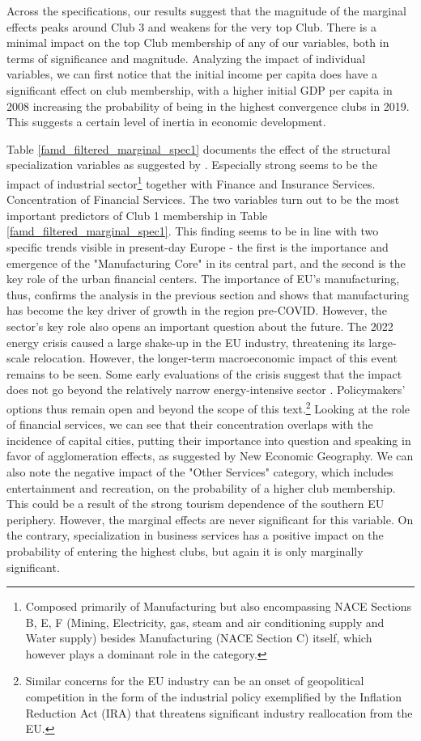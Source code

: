 \documentclass[11pt]{article}
\begin{document}
Across the specifications, our results suggest that the magnitude of the marginal effects peaks around Club 3 and weakens for the very top Club. There is a minimal impact on the top Club membership of any of our variables, both in terms of significance and magnitude. 
Analyzing the impact of individual variables, we can first notice that the initial income per capita does have a significant effect on club membership, with a higher initial GDP per capita in 2008 increasing the probability of being in the highest convergence clubs in 2019. This suggests a certain level of inertia in economic development.
 
Table \ref{famd_filtered_marginal_spec1} documents the effect of the structural specialization variables as suggested by \citet{cutrini2019economic}. Especially strong seems to be the impact of industrial sector\footnote{Composed primarily of Manufacturing but also encompassing NACE Sections B, E, F (Mining, Electricity, gas, steam and air conditioning supply and Water supply) besides Manufacturing (NACE Section C) itself, which however plays a dominant role in the category.} together with Finance and Insurance Services. Concentration of Financial Services. The two variables turn out to be the most important predictors of Club 1 membership in Table \ref{famd_filtered_marginal_spec1}. This finding seems to be in line with two specific trends visible in present-day Europe - the first is the importance and emergence of the "Manufacturing Core" in its central part, and the second is the key role of the urban financial centers. The importance of EU's manufacturing, thus, confirms the analysis in the previous section and shows that manufacturing has become the key driver of growth in the region pre-COVID. However, the sector's key role also opens an important question about the future. The 2022 energy crisis caused a large shake-up in the EU industry, threatening its large-scale relocation. However, the longer-term macroeconomic impact of this event remains to be seen. Some early evaluations of the crisis suggest that the impact does not go beyond the relatively narrow energy-intensive sector \citep{sgaravatti2023adjusting}. Policymakers' options thus remain open and beyond the scope of this text.\footnote{Similar concerns for the EU industry can be an onset of geopolitical competition in the form of the industrial policy exemplified by the Inflation Reduction Act (IRA) that threatens significant industry reallocation from the EU.} 
Looking at the role of financial services, we can see that their concentration overlaps with the incidence of capital cities, putting their importance into question and speaking in favor of agglomeration effects, as suggested by New Economic Geography.
We can also note the negative impact of the "Other Services" category, which includes entertainment and recreation, on the probability of a higher club membership. This could be a result of the strong tourism dependence of the southern EU periphery. However, the marginal effects are never significant for this variable. On the contrary, specialization in business services has a positive impact on the probability of entering the highest clubs, but again it is only marginally significant.
\end{document}
